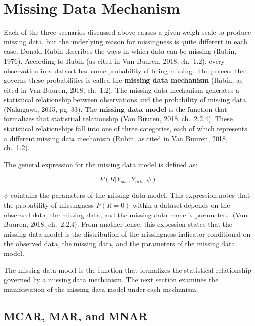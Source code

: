 \documentclass[12pt,oneside]{chicagocapstone}
\begin{document}
\section*{Missing Data Mechanism}\label{background-missing-data-mech}

Each of the three scenarios discussed above causes a given weigh scale
to produce missing data, but the underlying reason for missingness is
quite different in each case. Donald Rubin describes the ways in which
data can be missing (Rubin, 1976). According to Rubin (as cited in Van
Buuren, 2018, ch.~1.2), every observation in a dataset has some
probability of being missing. The process that governs these
probabilities is called the \textbf{missing data mechanism} (Rubin, as
cited in Van Buuren, 2018, ch.~1.2). The missing data mechanism
generates a statistical relationship between observations and the
probability of missing data (Nakagawa, 2015, pg. 83). The
\textbf{missing data model} is the function that formalizes that
statistical relationship (Van Buuren, 2018, ch.~2.2.4). These
statistical relationships fall into one of three categories, each of
which represents a different missing data mechanism (Rubin, as cited in
Van Buuren, 2018, ch.~1.2).

The general expression for the missing data model is defined as:

\[P(R|Y_{obs}, Y_{mis},\psi)\]

\(\psi\) cointains the parameters of the missing data model. This
expression notes that the probability of missingness \(P(R=0)\) within a
dataset depends on the observed data, the missing data, and the missing
data model's parameters. (Van Buuren, 2018, ch.~2.2.4). From another
lense, this expession states that the missing data model is the
distribution of the missingness indicator conditional on the observed
data, the missing data, and the parameters of the missing data model.

The missing data model is the function that formalizes the statistical
relationship governed by a missing data mechanism. The next section
examines the manifestation of the missing data model under each
mechanism.

\subsection*{MCAR, MAR, and MNAR}\label{background-mcar-mar-mnar}
\end{document}
